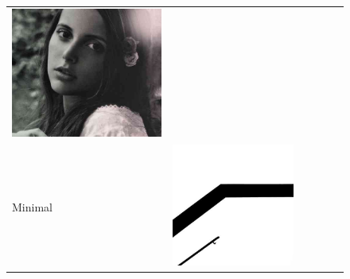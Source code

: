 \begin{figure}
\begin{tabular}{m{.01\linewidth} m{.16\linewidth} m{.16\linewidth} m{.16\linewidth} m{.16\linewidth} m{.16\linewidth}}
    \includegraphics[width=\linewidth]{../style/figures/flickr_on_flickr/pred_style_Melancholy/4.jpg} \\
    \begin{turn}{90}{Minimal}\end{turn} &
    \includegraphics[width=\linewidth]{../style/figures/flickr_on_flickr/pred_style_Minimal/0.jpg} &

\end{tabular}
\end{figure}
